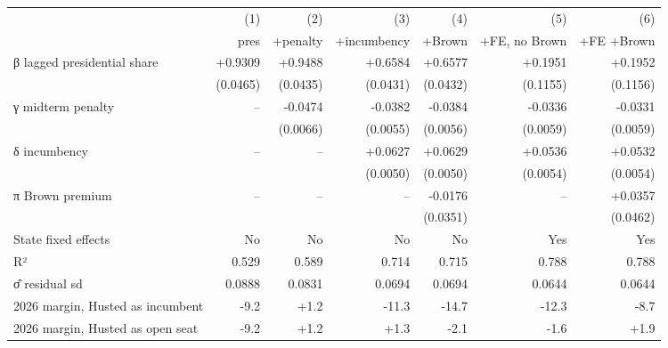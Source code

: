 \begin{tabular}{lrrrrrr}
\toprule
 & (1) & (2) & (3) & (4) & (5) & (6) \\
 & pres & +penalty & +incumbency & +Brown & +FE, no Brown & +FE +Brown \\
\midrule
β   lagged presidential share & +0.9309 & +0.9488 & +0.6584 & +0.6577 & +0.1951 & +0.1952 \\
 & (0.0465) & (0.0435) & (0.0431) & (0.0432) & (0.1155) & (0.1156) \\
γ   midterm penalty & – & -0.0474 & -0.0382 & -0.0384 & -0.0336 & -0.0331 \\
 &  & (0.0066) & (0.0055) & (0.0056) & (0.0059) & (0.0059) \\
δ   incumbency & – & – & +0.0627 & +0.0629 & +0.0536 & +0.0532 \\
 &  &  & (0.0050) & (0.0050) & (0.0054) & (0.0054) \\
π   Brown premium & – & – & – & -0.0176 & – & +0.0357 \\
 &  &  &  & (0.0351) &  & (0.0462) \\
State fixed effects & No & No & No & No & Yes & Yes \\
R² & 0.529 & 0.589 & 0.714 & 0.715 & 0.788 & 0.788 \\
σ̂  residual sd & 0.0888 & 0.0831 & 0.0694 & 0.0694 & 0.0644 & 0.0644 \\
2026 margin, Husted as incumbent & -9.2 & +1.2 & -11.3 & -14.7 & -12.3 & -8.7 \\
2026 margin, Husted as open seat & -9.2 & +1.2 & +1.3 & -2.1 & -1.6 & +1.9 \\
\bottomrule
\end{tabular}

